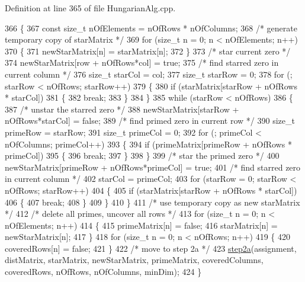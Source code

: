 Definition at line 365 of file Hungarian\+Alg.\+cpp.


\begin{DoxyCode}
366 \{
367     \textcolor{keyword}{const} \textcolor{keywordtype}{size\_t} nOfElements = nOfRows * nOfColumns;
368     \textcolor{comment}{/* generate temporary copy of starMatrix */}
369     \textcolor{keywordflow}{for} (\textcolor{keywordtype}{size\_t} n = 0; n < nOfElements; n++)
370     \{
371         newStarMatrix[n] = starMatrix[n];
372     \}
373     \textcolor{comment}{/* star current zero */}
374     newStarMatrix[row + nOfRows*col] = \textcolor{keyword}{true};
375     \textcolor{comment}{/* find starred zero in current column */}
376     \textcolor{keywordtype}{size\_t} starCol = col;
377     \textcolor{keywordtype}{size\_t} starRow = 0;
378     \textcolor{keywordflow}{for} (; starRow < nOfRows; starRow++)
379     \{
380         \textcolor{keywordflow}{if} (starMatrix[starRow + nOfRows * starCol])
381         \{
382             \textcolor{keywordflow}{break};
383         \}
384     \}
385     \textcolor{keywordflow}{while} (starRow < nOfRows)
386     \{
387         \textcolor{comment}{/* unstar the starred zero */}
388         newStarMatrix[starRow + nOfRows*starCol] = \textcolor{keyword}{false};
389         \textcolor{comment}{/* find primed zero in current row */}
390         \textcolor{keywordtype}{size\_t} primeRow = starRow;
391         \textcolor{keywordtype}{size\_t} primeCol = 0;
392         \textcolor{keywordflow}{for} (; primeCol < nOfColumns; primeCol++)
393         \{
394             \textcolor{keywordflow}{if} (primeMatrix[primeRow + nOfRows * primeCol])
395             \{
396                 \textcolor{keywordflow}{break};
397             \}
398         \}
399         \textcolor{comment}{/* star the primed zero */}
400         newStarMatrix[primeRow + nOfRows*primeCol] = \textcolor{keyword}{true};
401         \textcolor{comment}{/* find starred zero in current column */}
402         starCol = primeCol;
403         \textcolor{keywordflow}{for} (starRow = 0; starRow < nOfRows; starRow++)
404         \{
405             \textcolor{keywordflow}{if} (starMatrix[starRow + nOfRows * starCol])
406             \{
407                 \textcolor{keywordflow}{break};
408             \}
409         \}
410     \}
411     \textcolor{comment}{/* use temporary copy as new starMatrix */}
412     \textcolor{comment}{/* delete all primes, uncover all rows */}
413     \textcolor{keywordflow}{for} (\textcolor{keywordtype}{size\_t} n = 0; n < nOfElements; n++)
414     \{
415         primeMatrix[n] = \textcolor{keyword}{false};
416         starMatrix[n] = newStarMatrix[n];
417     \}
418     \textcolor{keywordflow}{for} (\textcolor{keywordtype}{size\_t} n = 0; n < nOfRows; n++)
419     \{
420         coveredRows[n] = \textcolor{keyword}{false};
421     \}
422     \textcolor{comment}{/* move to step 2a */}
423     \mbox{\hyperlink{class_assignment_problem_solver_adef6ec1494dd6058fdf1373bc2c6d6eb}{step2a}}(assignment, distMatrix, starMatrix, newStarMatrix, primeMatrix, coveredColumns, 
      coveredRows, nOfRows, nOfColumns, minDim);
424 \}
\end{DoxyCode}
